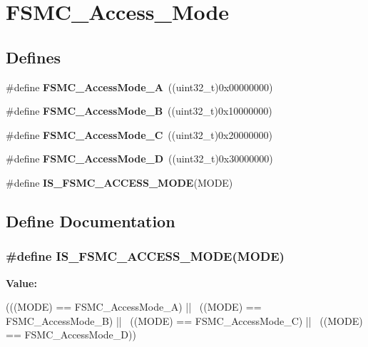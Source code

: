 \hypertarget{group__FSMC__Access__Mode}{
\section{FSMC\_\-Access\_\-Mode}
\label{group__FSMC__Access__Mode}
}
\subsection*{Defines}
\begin{DoxyCompactItemize}
\item 
\hypertarget{group__FSMC__Access__Mode_gae0f299b51c12257311694c4a8f5c00c3}{
\#define {\bfseries FSMC\_\-AccessMode\_\-A}~((uint32\_\-t)0x00000000)}
\label{group__FSMC__Access__Mode_gae0f299b51c12257311694c4a8f5c00c3}

\item 
\hypertarget{group__FSMC__Access__Mode_ga2d6ce7481eb5e0e86fda727c646e4109}{
\#define {\bfseries FSMC\_\-AccessMode\_\-B}~((uint32\_\-t)0x10000000)}
\label{group__FSMC__Access__Mode_ga2d6ce7481eb5e0e86fda727c646e4109}

\item 
\hypertarget{group__FSMC__Access__Mode_ga83ffa035cf2e95c957b67a2e8b879e86}{
\#define {\bfseries FSMC\_\-AccessMode\_\-C}~((uint32\_\-t)0x20000000)}
\label{group__FSMC__Access__Mode_ga83ffa035cf2e95c957b67a2e8b879e86}

\item 
\hypertarget{group__FSMC__Access__Mode_ga7c632e7ebeb0c0ab4919bb60b8714c7b}{
\#define {\bfseries FSMC\_\-AccessMode\_\-D}~((uint32\_\-t)0x30000000)}
\label{group__FSMC__Access__Mode_ga7c632e7ebeb0c0ab4919bb60b8714c7b}

\item 
\#define {\bfseries IS\_\-FSMC\_\-ACCESS\_\-MODE}(MODE)
\end{DoxyCompactItemize}


\subsection{Define Documentation}
\hypertarget{group__FSMC__Access__Mode_ga1844335f297ea30e9d7fae09ce562092}{
\subsubsection[{IS\_\-FSMC\_\-ACCESS\_\-MODE}]{\setlength{\rightskip}{0pt plus 5cm}\#define IS\_\-FSMC\_\-ACCESS\_\-MODE(MODE)}}
\label{group__FSMC__Access__Mode_ga1844335f297ea30e9d7fae09ce562092}
{\bfseries Value:}
\begin{DoxyCode}
(((MODE) == FSMC_AccessMode_A) || \
                                   ((MODE) == FSMC_AccessMode_B) || \
                                   ((MODE) == FSMC_AccessMode_C) || \
                                   ((MODE) == FSMC_AccessMode_D))
\end{DoxyCode}
